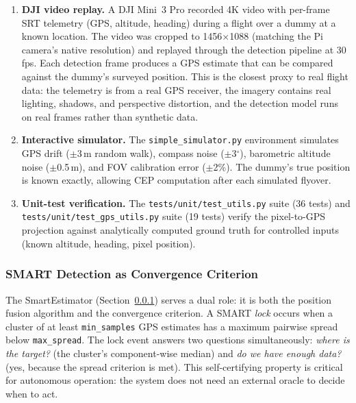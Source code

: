 \begin{enumerate}
  \item \textbf{DJI video replay.}  A DJI Mini~3 Pro recorded 4K video with per-frame SRT telemetry (GPS, altitude, heading) during a flight over a dummy at a known location.  The video was cropped to 1456$\times$1088 (matching the Pi camera's native resolution) and replayed through the detection pipeline at 30\,fps.  Each detection frame produces a GPS estimate that can be compared against the dummy's surveyed position.  This is the closest proxy to real flight data: the telemetry is from a real GPS receiver, the imagery contains real lighting, shadows, and perspective distortion, and the detection model runs on real frames rather than synthetic data.

  \item \textbf{Interactive simulator.}  The \texttt{simple\_simulator.py} environment simulates GPS drift ($\pm$3\,m random walk), compass noise ($\pm$3$^\circ$), barometric altitude noise ($\pm$0.5\,m), and FOV calibration error ($\pm$2\%).  The dummy's true position is known exactly, allowing CEP computation after each simulated flyover.

  \item \textbf{Unit-test verification.}  The \texttt{tests/unit/test\_utils.py} suite (36 tests) and \texttt{tests/unit/test\_gps\_utils.py} suite (19 tests) verify the pixel-to-GPS projection against analytically computed ground truth for controlled inputs (known altitude, heading, pixel position).
\end{enumerate}

\subsubsection{SMART Detection as Convergence Criterion}\label{sec:smart-estimator}

The SmartEstimator (Section~\ref{sec:smart-estimator}) serves a dual role: it is both the position fusion algorithm and the convergence criterion.  A SMART \emph{lock} occurs when a cluster of at least \texttt{min\_samples} GPS estimates has a maximum pairwise spread below \texttt{max\_spread}.  The lock event answers two questions simultaneously: \emph{where is the target?} (the cluster's component-wise median) and \emph{do we have enough data?} (yes, because the spread criterion is met).  This self-certifying property is critical for autonomous operation: the system does not need an external oracle to decide when to act.

